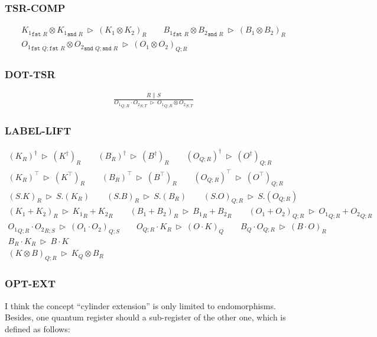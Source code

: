 \documentclass[manuscript, review, timestamp]{acmart}
\newcommand*{\fst}{\texttt{fst }}
\newcommand*{\snd}{\texttt{snd }}
\newcommand*{\reduce}{\ \triangleright\ }
\begin{document}
\subsubsection*{\textsf{TSR-COMP}}
\begin{gather*}
  {K_1}_{\fst R} \otimes {K_1}_{\snd R} \reduce (K_1 \otimes K_2)_{R}
  \qquad
  {B_1}_{\fst R} \otimes {B_2}_{\snd R} \reduce (B_1 \otimes B_2)_{R} \\
  {O_1}_{\fst Q; \fst R} \otimes {O_2}_{\snd Q; \snd R} \reduce (O_1 \otimes O_2)_{Q; R}
\end{gather*}

\subsubsection*{\textsf{DOT-TSR}}
\begin{align*}
  \frac{R \| S}{{O_1}_{Q; R} \cdot {O_2}_{S; T} \reduce {O_1}_{Q; R} \otimes {O_2}_{S; T}}
\end{align*}

\subsubsection*{\textsf{LABEL-LIFT}}
\begin{gather*}
  (K_{R})^\dagger \reduce (K^\dagger)_{R}
  \qquad
  (B_{R})^\dagger \reduce (B^\dagger)_{R}
  \qquad
  (O_{Q; R})^\dagger \reduce (O^\dagger)_{Q; R} \\
  (K_{R})^\top \reduce (K^\top)_{R}
  \qquad
  (B_{R})^\top \reduce (B^\top)_{R}
  \qquad
  (O_{Q; R})^\top \reduce (O^\top)_{Q; R} \\
  (S.K)_{R} \reduce S.(K_{R})
  \qquad
  (S.B)_{R} \reduce S.(B_{R})
  \qquad
  (S.O)_{Q; R} \reduce S.(O_{Q; R}) \\
  (K_1 + K_2)_{R} \reduce {K_1}_{R} + {K_2}_{R}
  \qquad
  (B_1 + B_2)_{R} \reduce {B_1}_{R} + {B_2}_{R}
  \qquad
  (O_1 + O_2)_{Q; R} \reduce {O_1}_{Q; R} + {O_2}_{Q; R}
\end{gather*}
\begin{gather*}
  {O_1}_{Q; R} \cdot {O_2}_{R; S} \reduce (O_1 \cdot O_2)_{Q; S}
  \qquad
  O_{Q; R} \cdot K_{R} \reduce (O \cdot K)_{Q}
  \qquad
  B_{Q} \cdot O_{Q; R} \reduce (B \cdot O)_{R} \\
  B_{R} \cdot K_{R} \reduce B \cdot K \\
  (K \otimes B)_{Q; R} \reduce K_{Q} \otimes B_{R}
\end{gather*}

\subsubsection*{\textsf{OPT-EXT}}
I think the concept ``cylinder extension'' is only limited to endomorphisms. Besides, one quantum register should a sub-register of the other one, which is defined as follows:
\end{document}
